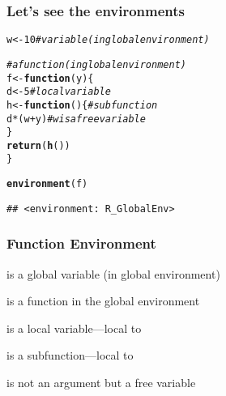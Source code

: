 \documentclass[12pt]{beamer}\usepackage[]{graphicx}\usepackage[]{color}
\makeatletter
\newcommand{\hlnum}[1]{\textcolor[rgb]{0.686,0.059,0.569}{#1}}%
\newcommand{\hlcom}[1]{\textcolor[rgb]{0.678,0.584,0.686}{\textit{#1}}}%
\newcommand{\hlopt}[1]{\textcolor[rgb]{0,0,0}{#1}}%
\newcommand{\hlstd}[1]{\textcolor[rgb]{0.345,0.345,0.345}{#1}}%
\newcommand{\hlkwa}[1]{\textcolor[rgb]{0.161,0.373,0.58}{\textbf{#1}}}%
\newcommand{\hlkwb}[1]{\textcolor[rgb]{0.69,0.353,0.396}{#1}}%
\newcommand{\hlkwc}[1]{\textcolor[rgb]{0.333,0.667,0.333}{#1}}%
\newcommand{\hlkwd}[1]{\textcolor[rgb]{0.737,0.353,0.396}{\textbf{#1}}}%
\newenvironment{kframe}{%
 \def\at@end@of@kframe{}%
 \ifinner\ifhmode%
  \def\at@end@of@kframe{\end{minipage}}%
  \begin{minipage}{\columnwidth}%
 \fi\fi%
 \def\FrameCommand##1{\hskip\@totalleftmargin \hskip-\fboxsep
 \colorbox{shadecolor}{##1}\hskip-\fboxsep
     \hskip-\linewidth \hskip-\@totalleftmargin \hskip\columnwidth}%
 \MakeFramed {\advance\hsize-\width
   \@totalleftmargin\z@ \linewidth\hsize
   \@setminipage}}%
 {\par\unskip\endMakeFramed%
 \at@end@of@kframe}
\newenvironment{knitrout}{}{} %
\makeatother
\begin{document}
\begin{frame}[fragile]
\frametitle{Let's see the environments}

\begin{knitrout}\footnotesize
{}\color{fgcolor}\begin{kframe}
\begin{alltt}
\hlstd{w} \hlkwb{<-} \hlnum{10}   \hlcom{# variable (in global environment)}

\hlcom{# a function (in global environment)}
\hlstd{f} \hlkwb{<-} \hlkwa{function}\hlstd{(}\hlkwc{y}\hlstd{) \{}
  \hlstd{d} \hlkwb{<-} \hlnum{5}     \hlcom{# local variable}
  \hlstd{h} \hlkwb{<-} \hlkwa{function}\hlstd{() \{}    \hlcom{# subfunction}
    \hlstd{d} \hlopt{*} \hlstd{(w} \hlopt{+} \hlstd{y)}     \hlcom{# w is a free variable}
  \hlstd{\}}
  \hlkwd{return}\hlstd{(}\hlkwd{h}\hlstd{())}
\hlstd{\}}

\hlkwd{environment}\hlstd{(f)}
\end{alltt}
\begin{verbatim}
## <environment: R_GlobalEnv>
\end{verbatim}
\end{kframe}
\end{knitrout}

\end{frame}


\begin{frame}[fragile]
\frametitle{Function Environment}

\bi
  \item {} is a global variable (in global environment)
  \item {} is a function in the global environment
  \item {} is a local variable---local to 
  \item {} is a subfunction---local to 
  \item {} is not an argument but a free variable
\ei

\end{frame}

\end{document}
